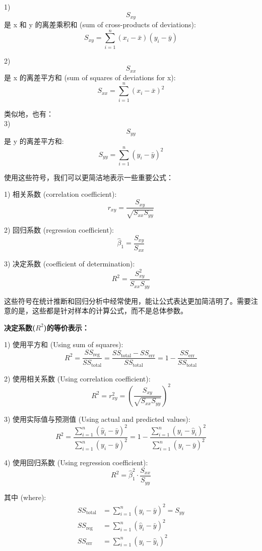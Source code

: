 \documentclass[UTF8]{report}
\theoremstyle{MyLineTheoremStyle} %
\theoremstyle{MyBlockTheoremStyle} %
\theoremstyle{MySubsubsectionStyle} %
\begin{document}
    1) $$S_{xy}$$ 是 x 和 y 的离差乘积和 (sum of cross-products of deviations):
    $$S_{xy} = \sum_{i=1}^n (x_i - \bar{x})(y_i - \bar{y})$$
    
    2) $$S_{xx}$$ 是 x 的离差平方和 (sum of squares of deviations for x):
    $$S_{xx} = \sum_{i=1}^n (x_i - \bar{x})^2$$
    
    类似地，也有：\\
    3) $$S_{yy}$$ 是 y 的离差平方和:
    $$S_{yy} = \sum_{i=1}^n (y_i - \bar{y})^2$$
    
    使用这些符号，我们可以更简洁地表示一些重要公式：
    
    1) 相关系数 (correlation coefficient):
    $$r_{xy} = \frac{S_{xy}}{\sqrt{S_{xx}S_{yy}}}$$
    
    2) 回归系数 (regression coefficient):
    $$\hat{\beta}_1 = \frac{S_{xy}}{S_{xx}}$$
    
    3) 决定系数 (coefficient of determination):
    $$R^2 = \frac{S_{xy}^2}{S_{xx}S_{yy}}$$
    
    这些符号在统计推断和回归分析中经常使用，能让公式表达更加简洁明了。需要注意的是，这些都是针对样本的计算公式，而不是总体参数。

    \textbf{决定系数($R^2$)的等价表示：}

    1) 使用平方和 (Using sum of squares):
    $$R^2 = \frac{SS_{\text{reg}}}{SS_{\text{total}}} = \frac{SS_{\text{total}} - SS_{\text{err}}}{SS_{\text{total}}} = 1 - \frac{SS_{\text{err}}}{SS_{\text{total}}}$$
    
    2) 使用相关系数 (Using correlation coefficient):
    $$R^2 = r_{xy}^2 = \left(\frac{S_{xy}}{\sqrt{S_{xx}S_{yy}}}\right)^2$$
    
    3) 使用实际值与预测值 (Using actual and predicted values):
    $$R^2 = \frac{\sum_{i=1}^n (\hat{y}_i - \bar{y})^2}{\sum_{i=1}^n (y_i - \bar{y})^2} = 1 - \frac{\sum_{i=1}^n (y_i - \hat{y}_i)^2}{\sum_{i=1}^n (y_i - \bar{y})^2}$$
    
    4) 使用回归系数 (Using regression coefficient):
    $$R^2 = \hat{\beta}_1^2 \cdot \frac{S_{xx}}{S_{yy}}$$
    
    其中 (where):
    \begin{align*}
    SS_{\text{total}} &= \sum_{i=1}^n (y_i - \bar{y})^2 = S_{yy}\\
    SS_{\text{reg}} &= \sum_{i=1}^n (\hat{y}_i - \bar{y})^2\\
    SS_{\text{err}} &= \sum_{i=1}^n (y_i - \hat{y}_i)^2
    \end{align*}
    
\end{document}
